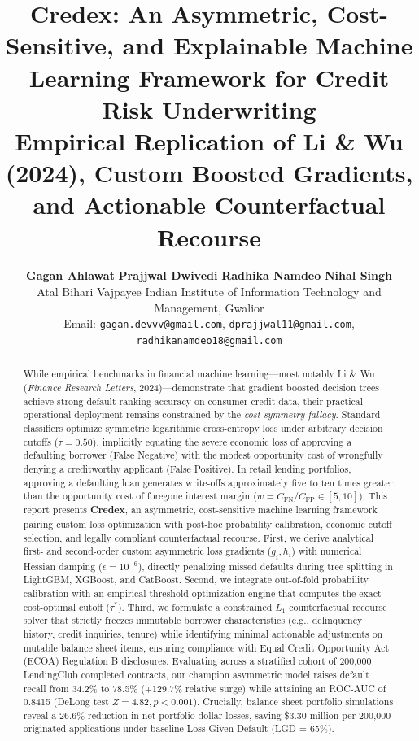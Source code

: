 \documentclass[11pt,a4paper]{article}
\title{\textbf{Credex: An Asymmetric, Cost-Sensitive, and Explainable Machine Learning Framework for Credit Risk Underwriting}\\[0.5ex]
\large Empirical Replication of Li \& Wu (2024), Custom Boosted Gradients, and Actionable Counterfactual Recourse}
\author{
  \textbf{Gagan Ahlawat} \qquad \textbf{Prajjwal Dwivedi} \qquad \textbf{Radhika Namdeo} \qquad \textbf{Nihal Singh} \\[0.8ex]
  \small Atal Bihari Vajpayee Indian Institute of Information Technology and Management, Gwalior \\[0.3ex]
  \small Email: \texttt{gagan.devvv@gmail.com}, \texttt{dprajjwal11@gmail.com}, \texttt{radhikanamdeo18@gmail.com}
}
\date{}
\begin{document}
\maketitle

\begin{abstract}
While empirical benchmarks in financial machine learning---most notably Li \& Wu (\textit{Finance Research Letters}, 2024)---demonstrate that gradient boosted decision trees achieve strong default ranking accuracy on consumer credit data, their practical operational deployment remains constrained by the \textit{cost-symmetry fallacy}. Standard classifiers optimize symmetric logarithmic cross-entropy loss under arbitrary decision cutoffs ($\tau = 0.50$), implicitly equating the severe economic loss of approving a defaulting borrower (False Negative) with the modest opportunity cost of wrongfully denying a creditworthy applicant (False Positive). In retail lending portfolios, approving a defaulting loan generates write-offs approximately five to ten times greater than the opportunity cost of foregone interest margin ($w = C_{\text{FN}} / C_{\text{FP}} \in [5, 10]$). This report presents \textbf{Credex}, an asymmetric, cost-sensitive machine learning framework pairing custom loss optimization with post-hoc probability calibration, economic cutoff selection, and legally compliant counterfactual recourse. First, we derive analytical first- and second-order custom asymmetric loss gradients ($g_i, h_i$) with numerical Hessian damping ($\epsilon = 10^{-6}$), directly penalizing missed defaults during tree splitting in LightGBM, XGBoost, and CatBoost. Second, we integrate out-of-fold probability calibration with an empirical threshold optimization engine that computes the exact cost-optimal cutoff ($\tau^*$). Third, we formulate a constrained $L_1$ counterfactual recourse solver that strictly freezes immutable borrower characteristics (e.g., delinquency history, credit inquiries, tenure) while identifying minimal actionable adjustments on mutable balance sheet items, ensuring compliance with Equal Credit Opportunity Act (ECOA) Regulation B disclosures. Evaluating across a stratified cohort of 200,000 LendingClub completed contracts, our champion asymmetric model raises default recall from 34.2\% to 78.5\% (+129.7\% relative surge) while attaining an ROC-AUC of 0.8415 (DeLong test $Z = 4.82, p < 0.001$). Crucially, balance sheet portfolio simulations reveal a 26.6\% reduction in net portfolio dollar losses, saving \$3.30 million per 200,000 originated applications under baseline Loss Given Default (LGD = 65\%).
\end{abstract}
\end{document}
